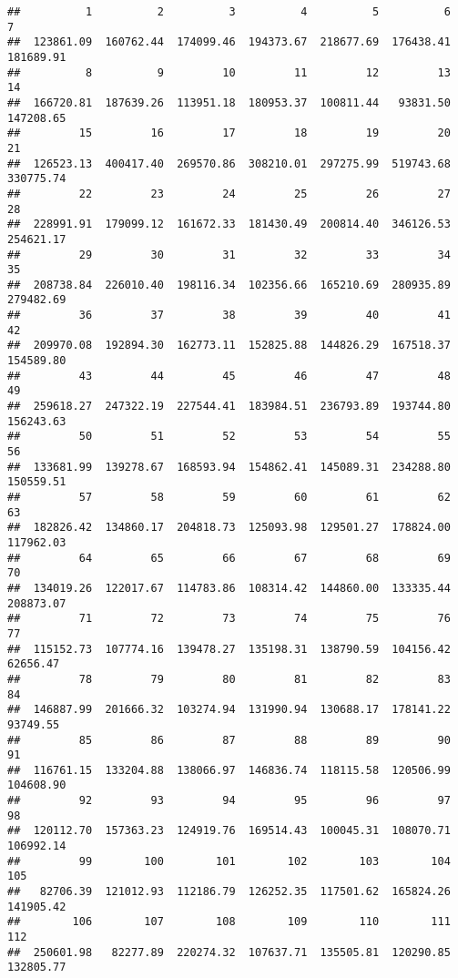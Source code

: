 \documentclass[
]{article}
\begin{document}
\begin{verbatim}
##          1          2          3          4          5          6          7 
##  123861.09  160762.44  174099.46  194373.67  218677.69  176438.41  181689.91 
##          8          9         10         11         12         13         14 
##  166720.81  187639.26  113951.18  180953.37  100811.44   93831.50  147208.65 
##         15         16         17         18         19         20         21 
##  126523.13  400417.40  269570.86  308210.01  297275.99  519743.68  330775.74 
##         22         23         24         25         26         27         28 
##  228991.91  179099.12  161672.33  181430.49  200814.40  346126.53  254621.17 
##         29         30         31         32         33         34         35 
##  208738.84  226010.40  198116.34  102356.66  165210.69  280935.89  279482.69 
##         36         37         38         39         40         41         42 
##  209970.08  192894.30  162773.11  152825.88  144826.29  167518.37  154589.80 
##         43         44         45         46         47         48         49 
##  259618.27  247322.19  227544.41  183984.51  236793.89  193744.80  156243.63 
##         50         51         52         53         54         55         56 
##  133681.99  139278.67  168593.94  154862.41  145089.31  234288.80  150559.51 
##         57         58         59         60         61         62         63 
##  182826.42  134860.17  204818.73  125093.98  129501.27  178824.00  117962.03 
##         64         65         66         67         68         69         70 
##  134019.26  122017.67  114783.86  108314.42  144860.00  133335.44  208873.07 
##         71         72         73         74         75         76         77 
##  115152.73  107774.16  139478.27  135198.31  138790.59  104156.42   62656.47 
##         78         79         80         81         82         83         84 
##  146887.99  201666.32  103274.94  131990.94  130688.17  178141.22   93749.55 
##         85         86         87         88         89         90         91 
##  116761.15  133204.88  138066.97  146836.74  118115.58  120506.99  104608.90 
##         92         93         94         95         96         97         98 
##  120112.70  157363.23  124919.76  169514.43  100045.31  108070.71  106992.14 
##         99        100        101        102        103        104        105 
##   82706.39  121012.93  112186.79  126252.35  117501.62  165824.26  141905.42 
##        106        107        108        109        110        111        112 
##  250601.98   82277.89  220274.32  107637.71  135505.81  120290.85  132805.77 

\end{verbatim}
\end{document}
